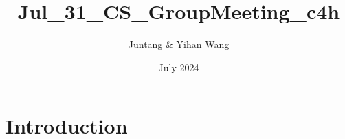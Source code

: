 \documentclass{article}
\title{Jul_31_CS_GroupMeeting_c4h}
\author{Juntang & Yihan Wang}
\date{July 2024}
\begin{document}
\maketitle

\section{Introduction}
\end{document}
